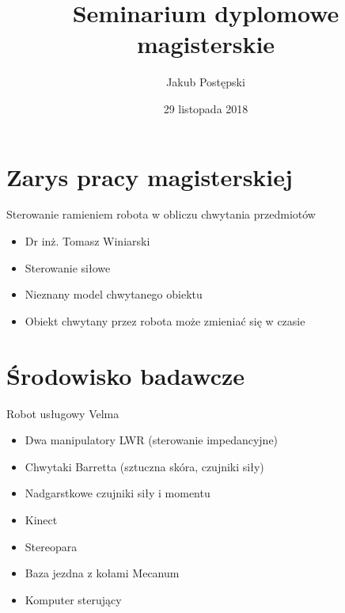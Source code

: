\documentclass{beamer}
\begin{document}
\title{Seminarium dyplomowe magisterskie}
\author{Jakub Postępski}
\date{29 listopada 2018}

\frame{\titlepage}

\section{Zarys pracy magisterskiej}
\begin{frame}{Sterowanie ramieniem robota w obliczu chwytania przedmiotów}

\begin{itemize}
\item Dr inż. Tomasz Winiarski
\end{itemize}

\begin{itemize}
\item Sterowanie siłowe
\item Nieznany model chwytanego obiektu
\item Obiekt chwytany przez robota może zmieniać się w czasie
\end{itemize}
\end{frame}

\section{Środowisko badawcze}

\begin{frame}{Robot usługowy Velma}
\begin{itemize}
\item Dwa manipulatory LWR (sterowanie impedancyjne)
\item Chwytaki Barretta (sztuczna skóra, czujniki siły)
\item Nadgarstkowe czujniki siły i momentu
\item Kinect
\item Stereopara
\item Baza jezdna z kołami Mecanum
\item Komputer sterujący
\end{itemize}
\end{frame}
\end{document}
